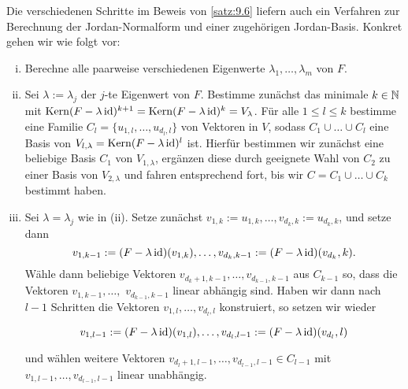 \begin{bemerkung}
	\label{bem:9.19}
	Die verschiedenen Schritte im Beweis von \autoref{satz:9.6} liefern auch ein Verfahren zur Berechnung der Jordan-Normalform und einer zugehörigen Jordan-Basis.
	Konkret gehen wir wie folgt vor:
	\begin{enumerate}[(i)]
		\item Berechne alle paarweise verschiedenen Eigenwerte $\lambda_1,\dots,\lambda_m$ von $F$.
		\item Sei $\lambda := \lambda_j$ der $j$-te Eigenwert von $F$.
		Bestimme zunächst das minimale $k \in \mathbb{N}$ mit $\operatorname{Kern}(F-\lambda \operatorname{id})^{k+1} = \operatorname{Kern}(F-\lambda \operatorname{id})^k = V_\lambda$.
		Für alle $1 \leq l \leq k$ bestimme eine Familie $C_l = \{u_{1,l},\dots,u_{d_l,l}\}$ von Vektoren in $V$, sodass $C_1 \cup \dots \cup C_l$ eine Basis von $V_{l,\lambda} = \operatorname{Kern}(F-\lambda \operatorname{id})^l$ ist.
		Hierfür bestimmen wir zunächst eine beliebige Basis $C_1$ von $V_{1,\lambda}$, ergänzen diese durch geeignete Wahl von $C_2$ zu einer Basis von $V_{2,\lambda}$ und fahren entsprechend fort, bis wir $C = C_1 \cup \dots \cup C_k$ bestimmt haben.
		\item Sei $\lambda = \lambda_j$ wie in (ii).
		Setze zunächst $v_{1,k} := u_{1,k}, \dots, v_{d_k,k} := u_{d_k,k}$, und setze dann
		\[
			v_{1,{k-1}} := (F-  \lambda \operatorname{id})(v_{1,k}), \dots, v_{d_k,k-1} := (F-\lambda \operatorname{id})(v_{d_k},k).
		\]
		Wähle dann beliebige Vektoren $v_{d_k+1,k-1}, \dots, v_{d_{k-1},k-1}$ aus $C_{k-1}$ so, dass die Vektoren $v_{1,k-1},\dots,$ \linebreak $v_{d_{k-1},k-1}$ linear abhängig sind.
		Haben wir dann nach $l-1$ Schritten die Vektoren $v_{1,l},\dots,v_{d_l,l}$ konstruiert, so setzen wir wieder
		
		\[
			v_{1,l-1} := (F-\lambda \operatorname{id})(v_{1,l}), \dots, v_{d_l,l-1} := (F-\lambda\operatorname{id})(v_{d_l},l)
		\]
		
		und wählen weitere Vektoren $v_{d_l+1,l-1}, \dots, v_{d_{l-1},l-1} \in C_{l-1}$ mit $v_{1,l-1},\dots,v_{d_{l-1},l-1}$ linear unabhängig.
		

\end{enumerate}
\end{bemerkung}
